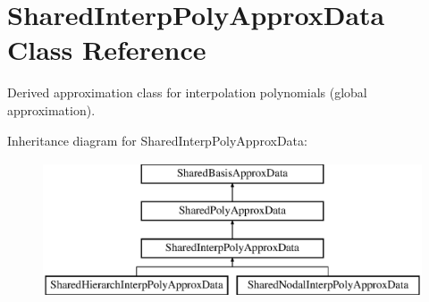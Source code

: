 \section{Shared\+Interp\+Poly\+Approx\+Data Class Reference}
\label{classPecos_1_1SharedInterpPolyApproxData}


Derived approximation class for interpolation polynomials (global approximation).  


Inheritance diagram for Shared\+Interp\+Poly\+Approx\+Data\+:\begin{figure}[H]
\begin{center}
\leavevmode
\includegraphics[height=4.000000cm]{classPecos_1_1SharedInterpPolyApproxData}
\end{center}
\end{figure}
